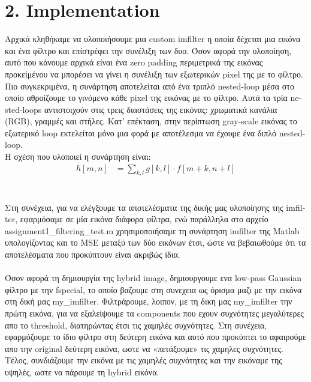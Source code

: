 \documentclass{article}
\newcommand{\tl}[1]{\textlatin{#1}}
\begin{document}
	\section*{2. \tl{Implementation}}
	Αρχικά κληθήκαμε να υλοποιήσουμε μια \tl{custom imfilter} η οποία δέχεται μια εικόνα και ένα φίλτρο 
	και επίστρέφει την συνέλιξη των δυο. Όσον αφορά την υλοποίηση, αυτό που κάνουμε αρχικά είναι ένα 
	\tl{zero padding} περιμετρικά της εικόνας προκείμένου να μπορέσει να γίνει η συνέλιξη των εξωτερικών 
	pixel της με το φίλτρο. Πιο συγκεκριμένα, η συνάρτηση αποτελείται από ένα τριπλό \tl{nested-loop} μέσα στο 
	οποίο αθροίζουμε το γινόμενο κάθε \tl{pixel} της εικόνας με το φίλτρο. Αυτά τα τρία \tl{nested-loops}
	αντιστοιχούν στις τρεις διαστάσεις της εικόνας: χρωματικά κανάλια (\tl{RGB}), γραμμές και στήλες. Κατ' επέκταση,
	στην περίπτωση \tl{gray-scale} εικόνας το εξωτερικό \tl{loop} εκτελείται μόνο μια φορά με αποτέλεσμα να έχουμε
	ένα διπλό \tl{nested-loop}.\\
	
	\noindent
	Η σχέση που υλοποιεί η συνάρτηση είναι:
	\begin{align*}
		h[m,n] &= \sum_{k,l} g[k,l] \cdot f[m+k,n+l]
	\end{align*}
	\\\\
	\noindent
	Στη συνέχεια, για να ελέγξουμε τα αποτελέσματα της δικής μας υλοποίησης της \tl{imfilter}, εφαρμόσαμε σε μία εικόνα διάφορα φίλτρα, ενώ παράλληλα στο αρχείο \tl{assignment1\_filtering\_test.m} χρησιμοποιήσαμε τη συνάρτηση \tl{imfilter} της  \tl{Matlab} υπολογίζοντας και το \tl{MSE} μεταξύ των δύο εικόνων έτσι, ώστε να βεβαιωθούμε ότι τα αποτελέσματα που προκύπτουν είναι ακριβώς ίδια.
	\\\\
	\noindent
	Όσον αφορά τη δημιουργία της \tl{hybrid image}, δημιουργουμε ενα \tl{low-pass Gaussian} φίλτρο με την \tl{fspecial}, 
	το οποίο βαζουμε στη συνεχεια ως όρισμα μαζι με την εικόνα στη δική μας \tl{my\_imfilter}. Φιλτράρουμε, λοιπον, με τη 
	δικη μας \tl{my\_imfilter} την πρώτη εικόνα, για να εξαλείψουμε τα components που εχουν συχνότητες μεγαλύτερες απο το threshold, 
	διατηρώντας έτσι τις χαμηλές συχνότητες. Στη συνέχεια, εφαρμόζουμε το ίδιο φίλτρο στη δεύτερη εικόνα και αυτό που προκύπτει 
	το αφαιρούμε απο την original δεύτερη εικόνα, ωστε να «πετάξουμε» τις χαμηλες συχνότητες. Τέλος, συνδιάζουμε την εικόνα με 
	τις χαμηλές συχνότητες και την εικόναμε της υψηλές, ωστε να πάρουμε τη \tl{hybrid} εικόνα. 
	
	\pagebreak
\end{document}
